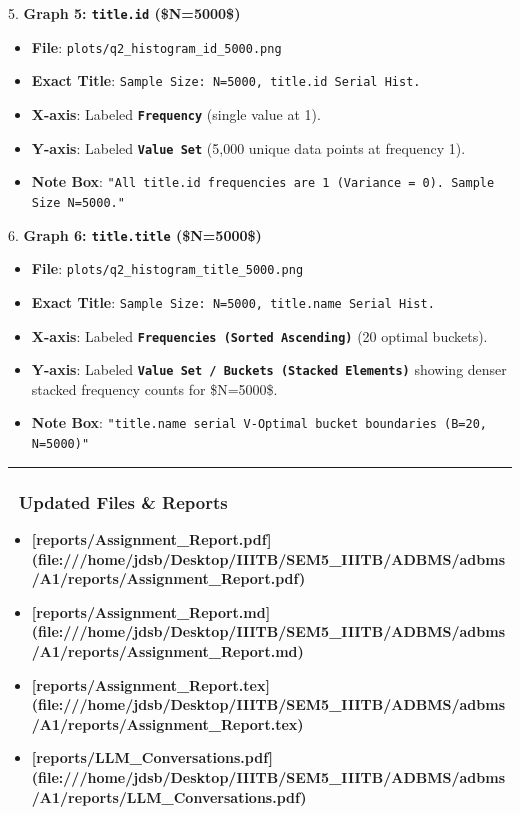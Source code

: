 \documentclass[11pt,a4paper]{article}
\begin{document}
5. \textbf{Graph 5: \texttt{title.id} (\$N=5000\$)}

\begin{itemize}
\item \textbf{File}: \texttt{plots/q2\_histogram\_id\_5000.png}
\item \textbf{Exact Title}: \texttt{Sample Size: N=5000, title.id Serial Hist.}
\item \textbf{X-axis}: Labeled \textbf{\texttt{Frequency}} (single value at 1).
\item \textbf{Y-axis}: Labeled \textbf{\texttt{Value Set}} (5,000 unique data points at frequency 1).
\item \textbf{Note Box}: \texttt{"All title.id frequencies are 1 (Variance = 0). Sample Size N=5000."}
\end{itemize}

6. \textbf{Graph 6: \texttt{title.title} (\$N=5000\$)}

\begin{itemize}
\item \textbf{File}: \texttt{plots/q2\_histogram\_title\_5000.png}
\item \textbf{Exact Title}: \texttt{Sample Size: N=5000, title.name Serial Hist.}
\item \textbf{X-axis}: Labeled \textbf{\texttt{Frequencies (Sorted Ascending)}} (20 optimal buckets).
\item \textbf{Y-axis}: Labeled \textbf{\texttt{Value Set / Buckets (Stacked Elements)}} showing denser stacked frequency counts for \$N=5000\$.
\item \textbf{Note Box}: \texttt{"title.name serial V-Optimal bucket boundaries (B=20, N=5000)"}
\end{itemize}

\hrule


\subsubsection{📄 Updated Files \& Reports}
\begin{itemize}
\item \textbf{[reports/Assignment\_Report.pdf](file:///home/jdsb/Desktop/IIITB/SEM5\_IIITB/ADBMS/adbms/A1/reports/Assignment\_Report.pdf)}
\item \textbf{[reports/Assignment\_Report.md](file:///home/jdsb/Desktop/IIITB/SEM5\_IIITB/ADBMS/adbms/A1/reports/Assignment\_Report.md)}
\item \textbf{[reports/Assignment\_Report.tex](file:///home/jdsb/Desktop/IIITB/SEM5\_IIITB/ADBMS/adbms/A1/reports/Assignment\_Report.tex)}
\item \textbf{[reports/LLM\_Conversations.pdf](file:///home/jdsb/Desktop/IIITB/SEM5\_IIITB/ADBMS/adbms/A1/reports/LLM\_Conversations.pdf)}
\end{itemize}
\end{document}
